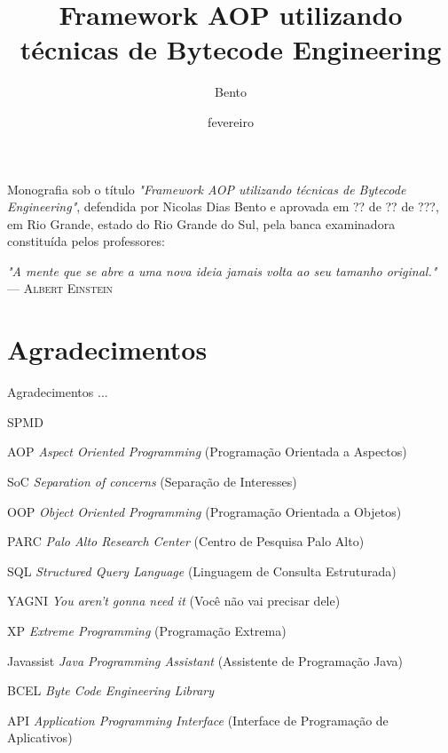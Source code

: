 \documentclass[tc,oneside]{iiufrgs}
\title{Framework AOP utilizando técnicas de Bytecode Engineering}
\author{Bento}{Nicolas}
\date{fevereiro}{2014}
\begin{document}
\maketitle

\begin{folhadeaprovacao}
Monografia sob o título \textit{"Framework AOP utilizando técnicas de Bytecode Engineering"}, defendida por Nicolas Dias Bento e aprovada em ?? de ?? de ???, em Rio Grande, estado do Rio Grande do Sul, pela banca examinadora constituída pelos professores:
\end{folhadeaprovacao}

\clearpage

\begin{flushright}
\mbox{}\vfill
{\sffamily\itshape
"A mente que se abre a uma nova ideia jamais volta ao seu tamanho original."\\}
--- \textsc{Albert Einstein}
\end{flushright}

\chapter*{Agradecimentos}

Agradecimentos ...

\tableofcontents

\begin{listofabbrv}{SPMD}
	\item[AOP] \textit{Aspect Oriented Programming} (Programação Orientada a Aspectos)
	\item[SoC] \textit{Separation of concerns} (Separação de Interesses)
	\item[OOP] \textit{Object Oriented Programming} (Programação Orientada a Objetos)
	\item[PARC] \textit{Palo Alto Research Center} (Centro de Pesquisa Palo Alto) 
	\item[SQL] \textit{Structured Query Language} (Linguagem de Consulta Estruturada)
	\item[YAGNI] \textit{You aren’t gonna need it} (Você não vai precisar dele)
	\item[XP] \textit{Extreme Programming} (Programação Extrema)
	\item[Javassist] \textit{Java Programming Assistant} (Assistente de Programação Java)
	\item[BCEL] \textit{Byte Code Engineering Library}
	\item[API] \textit{Application Programming Interface} (Interface de Programação de Aplicativos)
\end{listofabbrv}
\end{document}
